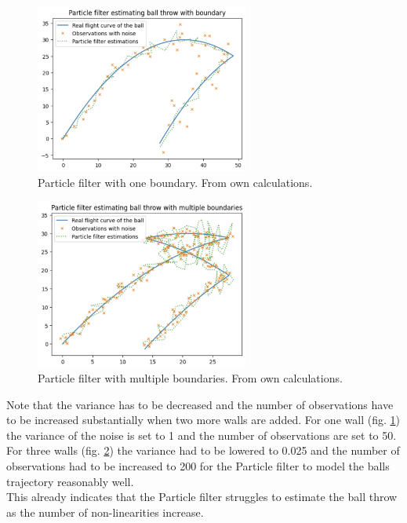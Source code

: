 \documentclass[conference]{IEEEtran}
\begin{document}
\begin{figure}
	\centering
	\includegraphics[width=70mm]{figs/particle-filter-one-boundary}
	\caption{Particle filter with one boundary. From own calculations.}
	\label{fig:particle-filter-one-boundary}
\end{figure}
\begin{figure}
	\centering
	\includegraphics[width=70mm]{figs/particle-filter-multiple-boundaries}
	\caption{Particle filter with multiple boundaries. From own calculations.}
	\label{fig:particle-filter-multiple-boundaries}
\end{figure}

Note that the variance has to be decreased and the number of observations have to be increased substantially when two more walls are added. 
For one wall (fig. \ref{fig:particle-filter-one-boundary}) the variance of the noise is set to 1 and the number of observations are set to 50.
For three walls (fig. \ref{fig:particle-filter-multiple-boundaries}) the variance had to be lowered to 0.025 and the number of observations had to be increased to 200 for the Particle filter to model the balls trajectory reasonably well. \\
This already indicates that the Particle filter struggles to estimate the ball throw as the number of non-linearities increase. 
\end{document}
